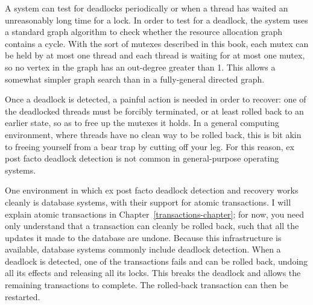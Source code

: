 A system can test for deadlocks periodically or when a thread has
waited an unreasonably long time for a lock.  In order to test for a
deadlock, the system uses a standard graph algorithm to check whether
the resource allocation graph contains a cycle. With the sort of
mutexes described in this book, each mutex can be held by at most
one thread and each thread is waiting for at most one mutex, so no
vertex in the graph has an out-degree greater than 1.  This allows a
somewhat simpler graph search than in a fully-general directed graph.

Once a deadlock is detected, a painful action is needed in order to
recover: one of the deadlocked threads must be forcibly terminated, or
at least rolled back to an earlier state, so as to free up the
mutexes it holds.  In a general computing environment, where threads
have no clean way to be rolled back, this is bit akin to freeing
yourself from a bear trap by cutting off your leg.  For this reason,
ex post facto deadlock detection is not common in general-purpose
operating systems.

One environment in which ex post facto deadlock detection and recovery
works cleanly is database systems, with their support for atomic
transactions.  I will explain atomic transactions in Chapter~\ref{transactions-chapter};
for now, you need only understand that a transaction can
cleanly be rolled back, such that all the updates it made to the
database are undone.  Because this infrastructure is available,
database systems commonly include deadlock detection.  When a deadlock
is detected, one of the transactions fails and can be rolled back,
undoing all its effects and releasing all its locks.  This breaks the
deadlock and allows the remaining transactions to complete.  The
rolled-back transaction can then be restarted.

